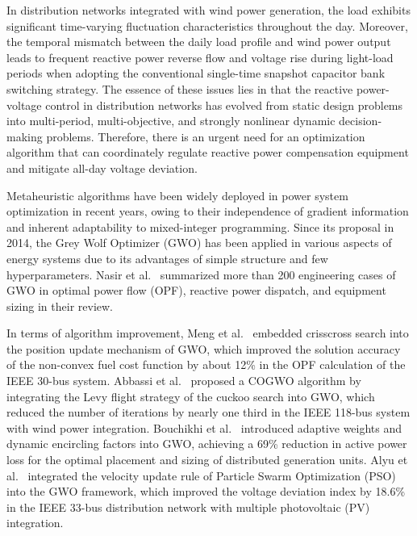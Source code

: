 In distribution networks integrated with wind power generation, the load exhibits significant time-varying fluctuation characteristics throughout the day. Moreover, the temporal mismatch between the daily load profile and wind power output leads to frequent reactive power reverse flow and voltage rise during light-load periods when adopting the conventional single-time snapshot capacitor bank switching strategy. The essence of these issues lies in that the reactive power-voltage control in distribution networks has evolved from static design problems into multi-period, multi-objective, and strongly nonlinear dynamic decision-making problems. Therefore, there is an urgent need for an optimization algorithm that can coordinately regulate reactive power compensation equipment and mitigate all-day voltage deviation.

Metaheuristic algorithms have been widely deployed in power system optimization in recent years, owing to their independence of gradient information and inherent adaptability to mixed-integer programming. Since its proposal in 2014, the Grey Wolf Optimizer (GWO) has been applied in various aspects of energy systems due to its advantages of simple structure and few hyperparameters. Nasir et al.~\cite{b1} summarized more than 200 engineering cases of GWO in optimal power flow (OPF), reactive power dispatch, and equipment sizing in their review.

In terms of algorithm improvement, Meng et al.~\cite{b2} embedded crisscross search into the position update mechanism of GWO, which improved the solution accuracy of the non-convex fuel cost function by about 12\% in the OPF calculation of the IEEE 30-bus system. Abbassi et al.~\cite{b3} proposed a COGWO algorithm by integrating the Levy flight strategy of the cuckoo search into GWO, which reduced the number of iterations by nearly one third in the IEEE 118-bus system with wind power integration. Bouchikhi et al.~\cite{b4} introduced adaptive weights and dynamic encircling factors into GWO, achieving a 69\% reduction in active power loss for the optimal placement and sizing of distributed generation units. Alyu et al.~\cite{b5} integrated the velocity update rule of Particle Swarm Optimization (PSO) into the GWO framework, which improved the voltage deviation index by 18.6\% in the IEEE 33-bus distribution network with multiple photovoltaic (PV) integration.

